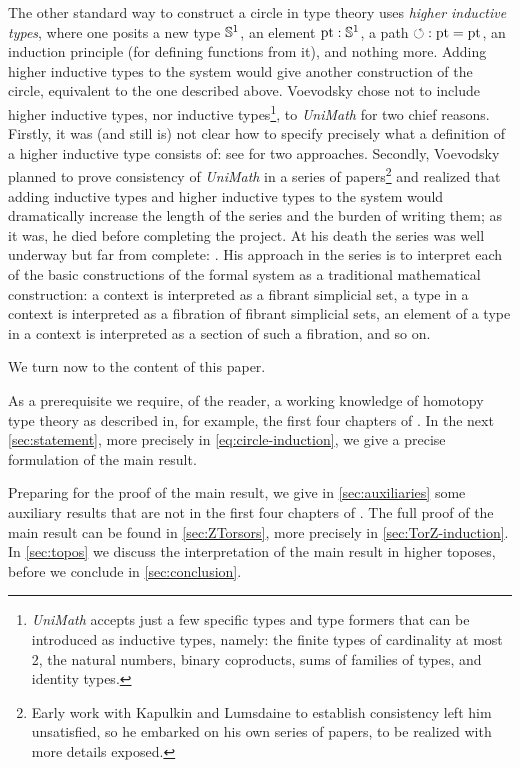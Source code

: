 \documentclass[a4paper,12pt]{amsart}
\begin{document}
The other standard way to construct a circle in type theory uses {\em higher inductive types}, where one posits a new type ${\mathbb{S}^1}$, an element
${\mathord{\mathrm{pt}}} : {\mathbb{S}^1}$, a path ${\circlearrowleft} : {\mathord{\mathrm{pt}}} = {\mathord{\mathrm{pt}}}$, an induction principle (for defining functions from it), and nothing more.
%
Adding higher inductive types to the system would give another construction of the circle, equivalent to the one described above.
%
Voevodsky chose not to include higher inductive types, nor inductive types\footnote{{\em UniMath} accepts just a few specific types
  and type formers that can be introduced as inductive types, namely: the finite types of cardinality at most 2, the natural numbers, binary
  coproducts, sums of families of types, and identity types.}, to {\em UniMath} for two chief reasons.
%
Firstly, it was (and still is) not clear how to specify precisely what a definition of a higher inductive type consists of: see
\cite{1705.07088,HoTT-Agda-HIT} for two approaches.
%
Secondly, Voevodsky planned to prove consistency of {\sl UniMath} in a series of papers\footnote{Early work \cite{1211.2851} with
  Kapulkin and Lumsdaine to establish consistency left him unsatisfied, so he embarked on his own series of papers, to be realized with more details
  exposed.} and realized that adding inductive types and higher inductive types to the system would dramatically increase the length of the
series and the burden of writing them; as it was, he died before completing the project.
%
At his death the series was well underway but far from complete: \cite{103,109,VV-relmonad,112,39,MR3607209,MR3607210}.
%
His approach in the series is to interpret each of the basic constructions of the formal system as a traditional mathematical construction: a
context is interpreted as a fibrant simplicial set, a type in a context is interpreted as a fibration of fibrant simplicial sets, an element of
a type in a context is interpreted as a section of such a fibration, and so on.

We turn now to the content of this paper.
\egroup

As a prerequisite we require, of the reader, a working knowledge of homotopy type theory
as described in, for example, the first four chapters of \cite{hottbook}.
In the next \cref{sec:statement}, more precisely in \cref{eq:circle-induction},
we give a precise formulation of the main result.

Preparing for the proof of the main result,
we give in \cref{sec:auxiliaries} some auxiliary results
that are not in the first four chapters of \cite{hottbook}.
The full proof of the main result can be found in \cref{sec:ZTorsors},
more precisely in \cref{sec:TorZ-induction}.
In \cref{sec:topos} we discuss the interpretation of the main result
in higher toposes, before we conclude in \cref{sec:conclusion}.
\end{document}
